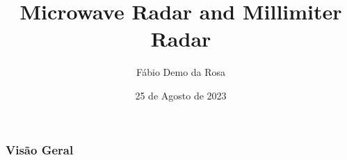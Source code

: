 \documentclass[xcolor=dvipsnames, aspectratio=169]{beamer}
\title[]{Microwave Radar and Millimiter Radar} %
\author[]{Fábio Demo da Rosa} %
\institute[UFSM] %
{
Universidade Federal de Santa Maria \\ %
Pós-Graduação em Ciência da Computação \\
Disciplina de Robótica Móvel\\
\medskip
\textit{faberdemo@gmail.com} %
}
\date{25 de Agosto de 2023} %
\begin{document}
\begin{frame}
\titlepage %
\end{frame}

\begin{frame}
\frametitle{Visão Geral} %
\tableofcontents %
\end{frame}


\end{document}
